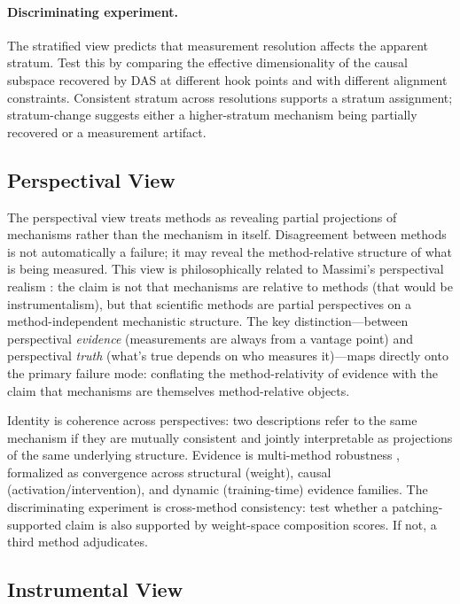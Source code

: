 \documentclass[11pt]{article}
\theoremstyle{remark}
\begin{document}
\paragraph{Discriminating experiment.}
The stratified view predicts that measurement resolution affects the
apparent stratum.  Test this by comparing the effective dimensionality
of the causal subspace recovered by DAS at different hook points and
with different alignment constraints.  Consistent stratum across
resolutions supports a stratum assignment; stratum-change suggests
either a higher-stratum mechanism being partially recovered or a
measurement artifact.

\subsection{Perspectival View}

The perspectival view treats methods as revealing partial projections of
mechanisms rather than the mechanism in itself.  Disagreement between
methods is not automatically a failure; it may reveal the method-relative
structure of what is being measured.  This view is philosophically related
to Massimi's perspectival realism \citep{massimi2022}: the claim is not
that mechanisms are relative to methods (that would be instrumentalism),
but that scientific methods are partial perspectives on a
method-independent mechanistic structure.  The key distinction---between
perspectival \emph{evidence} (measurements are always from a vantage
point) and perspectival \emph{truth} (what's true depends on who measures
it)---maps directly onto the primary failure mode: conflating the
method-relativity of evidence with the claim that mechanisms are
themselves method-relative objects.

Identity is coherence across perspectives: two descriptions refer to the
same mechanism if they are mutually consistent and jointly interpretable
as projections of the same underlying structure.  Evidence is
multi-method robustness \citep{tower2026mechval}, formalized as
convergence across structural (weight), causal (activation/intervention),
and dynamic (training-time) evidence families.  The discriminating
experiment is cross-method consistency: test whether a patching-supported
claim is also supported by weight-space composition scores.  If not,
a third method adjudicates.

\subsection{Instrumental View}
\end{document}
